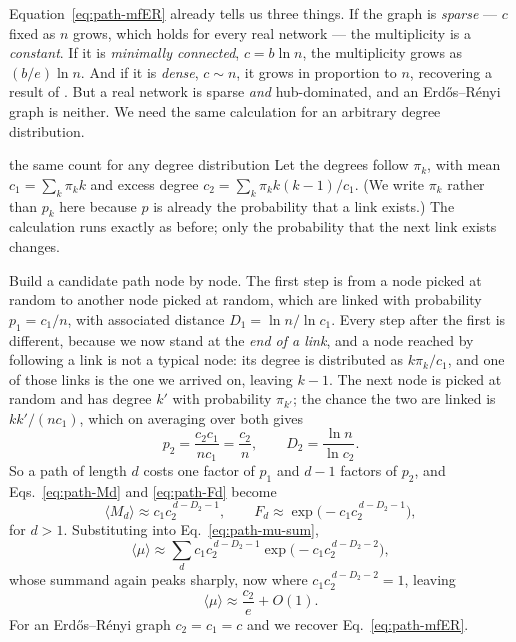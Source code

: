 Equation~\eqref{eq:path-mfER} already tells us three things. If the graph is
\emph{sparse} --- $c$ fixed as $n$ grows, which holds for every real network
--- the multiplicity is a \emph{constant}. If it is \emph{minimally connected},
$c=b\ln n$, the multiplicity grows as $(b/e)\ln n$. And if it is \emph{dense},
$c\sim n$, it grows in proportion to $n$, recovering a result of
\citet{dong2025}. But a real network is sparse \emph{and} hub-dominated, and an
Erd\H{o}s--R\'enyi graph is neither. We need the same calculation for an arbitrary
degree distribution.

\begin{calculation}{the same count for any degree distribution}
Let the degrees follow $\pi_k$, with mean $c_1=\sum_k \pi_k k$ and excess degree
$c_2=\sum_k \pi_k k(k-1)/c_1$. (We write $\pi_k$ rather than $p_k$ here because $p$
is already the probability that a link exists.) The calculation runs exactly as
before; only the probability that the next link exists changes.

Build a candidate path node by node. The first step is from a node picked at
random to another node picked at random, which are linked with probability
$p_1=c_1/n$, with associated distance $D_1=\ln n/\ln c_1$. Every step after the
first is different, because we now stand at the \emph{end of a link}, and a node
reached by following a link is not a typical node: its degree is distributed as
$k\pi_k/c_1$, and one of those links is the one we arrived on, leaving $k-1$. The
next node is picked at random and has degree $k'$ with probability $\pi_{k'}$; the
chance the two are linked is $kk'/(nc_1)$, which on averaging over both gives
\begin{equation}
  p_2 = \frac{c_2 c_1}{n c_1} = \frac{c_2}{n},
  \qquad D_2 = \frac{\ln n}{\ln c_2}.
  \label{eq:path-p2}
\end{equation}
So a path of length $d$ costs one factor of $p_1$ and $d-1$ factors of $p_2$, and
Eqs.~\eqref{eq:path-Md} and \eqref{eq:path-Fd} become
\begin{equation}
  \langle M_d\rangle \approx c_1 c_2^{\,d-D_2-1},
  \qquad
  F_d \approx \exp\big(-c_1 c_2^{\,d-D_2-1}\big),
  \label{eq:path-Mdk}
\end{equation}
for $d>1$. Substituting into Eq.~\eqref{eq:path-mu-sum},
\begin{equation}
  \langle\mu\rangle \approx \sum_d c_1 c_2^{\,d-D_2-1}
  \exp\big(-c_1 c_2^{\,d-D_2-2}\big),
  \label{eq:path-ksum}
\end{equation}
whose summand again peaks sharply, now where $c_1 c_2^{\,d-D_2-2}=1$, leaving
\begin{equation}
  \langle\mu\rangle \approx \frac{c_2}{e} + O(1).
  \label{eq:path-mf}
\end{equation}
For an Erd\H{o}s--R\'enyi graph $c_2=c_1=c$ and we recover
Eq.~\eqref{eq:path-mfER}.
\end{calculation}

